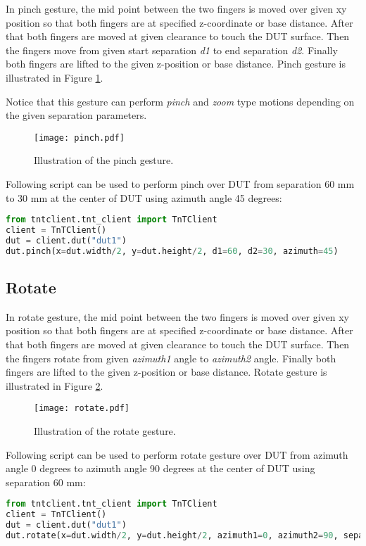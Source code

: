 In pinch gesture, the mid point between the two fingers is moved over given xy position so that both fingers are at specified z-coordinate or base distance. After that both fingers are moved at given clearance to touch the DUT surface. Then the fingers move from given start separation \emph{d1} to end separation \emph{d2}. Finally both fingers are lifted to the given z-position or base distance. Pinch gesture is illustrated in Figure \ref{fig:pinch}.

Notice that this gesture can perform \emph{pinch} and \emph{zoom} type motions depending on the given separation parameters.

\begin{figure}[h]
	\centering
	\texttt{[image: pinch.pdf]}
	\caption{Illustration of the pinch gesture.}
	\label{fig:pinch}
\end{figure}

Following script can be used to perform pinch over DUT from separation 60 mm to 30 mm at the center of DUT using azimuth angle 45 degrees:

\begin{lstlisting}[language=Python]
from tntclient.tnt_client import TnTClient
client = TnTClient()
dut = client.dut("dut1")
dut.pinch(x=dut.width/2, y=dut.height/2, d1=60, d2=30, azimuth=45)
\end{lstlisting}

\subsection{Rotate}

In rotate gesture, the mid point between the two fingers is moved over given xy position so that both fingers are at specified z-coordinate or base distance. After that both fingers are moved at given clearance to touch the DUT surface. Then the fingers rotate from given \emph{azimuth1} angle to \emph{azimuth2} angle. Finally both fingers are lifted to the given z-position or base distance. Rotate gesture is illustrated in Figure \ref{fig:rotate}. 

\begin{figure}[h]
	\centering
	\texttt{[image: rotate.pdf]}
	\caption{Illustration of the rotate gesture.}
	\label{fig:rotate}
\end{figure}

Following script can be used to perform rotate gesture over DUT from azimuth angle 0 degrees to azimuth angle 90 degrees at the center of DUT using separation 60 mm:

\begin{lstlisting}[language=Python]
from tntclient.tnt_client import TnTClient
client = TnTClient()
dut = client.dut("dut1")
dut.rotate(x=dut.width/2, y=dut.height/2, azimuth1=0, azimuth2=90, separation=60)
\end{lstlisting}
